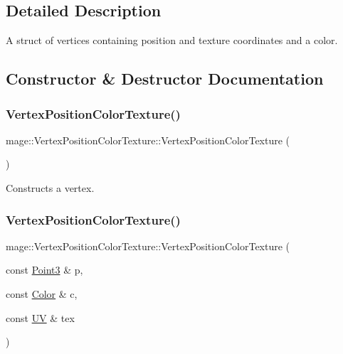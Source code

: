 \subsection{Detailed Description}
A struct of vertices containing position and texture coordinates and a color. 

\subsection{Constructor \& Destructor Documentation}
\hypertarget{structmage_1_1_vertex_position_color_texture_a49020fb0c115c3dc3c94471fcbc30a82}{}\label{structmage_1_1_vertex_position_color_texture_a49020fb0c115c3dc3c94471fcbc30a82} 
\subsubsection{\texorpdfstring{Vertex\+Position\+Color\+Texture()}{VertexPositionColorTexture()}\hspace{0.1cm}{\footnotesize\ttfamily [1/4]}}
{\footnotesize\ttfamily mage\+::\+Vertex\+Position\+Color\+Texture\+::\+Vertex\+Position\+Color\+Texture (\begin{DoxyParamCaption}{ }\end{DoxyParamCaption})\hspace{0.3cm}{\ttfamily [default]}}

Constructs a vertex. \hypertarget{structmage_1_1_vertex_position_color_texture_a98753386ae479cdc11174136bf8e9412}{}\label{structmage_1_1_vertex_position_color_texture_a98753386ae479cdc11174136bf8e9412} 
\subsubsection{\texorpdfstring{Vertex\+Position\+Color\+Texture()}{VertexPositionColorTexture()}\hspace{0.1cm}{\footnotesize\ttfamily [2/4]}}
{\footnotesize\ttfamily mage\+::\+Vertex\+Position\+Color\+Texture\+::\+Vertex\+Position\+Color\+Texture (\begin{DoxyParamCaption}\item[{const \hyperlink{structmage_1_1_point3}{Point3} \&}]{p,  }\item[{const \hyperlink{structmage_1_1_color}{Color} \&}]{c,  }\item[{const \hyperlink{structmage_1_1_u_v}{UV} \&}]{tex }\end{DoxyParamCaption})\hspace{0.3cm}{\ttfamily [explicit]}}

